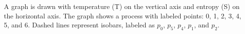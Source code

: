 A graph is drawn with temperature (T) on the vertical axis and entropy (S) on the horizontal axis. The graph shows a process with labeled points: 0, 1, 2, 3, 4, 5, and 6. Dashed lines represent isobars, labeled as \( p_0 \), \( p_5 \), \( p_4 \), \( p_1 \), and \( p_2 \).